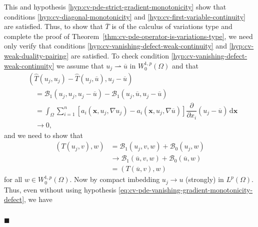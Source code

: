 \begingroup
\renewcommand{\endProof}{\par\nobreak\hfill$\blacksquare$\par\vspace{0.1cm}}
\begingroup
\renewenvironment{Proof}{\par}{\par\nobreak\hfill$\blacksquare$\par\vspace{0.1cm}}
\begin{Proof}
This and hypothesis \ref{hyp:cv-pde-strict-gradient-monotonicity} show that conditions \ref{hyp:cv-diagonal-monotonicity} and \ref{hyp:cv-first-variable-continuity} are satisfied. Thus, to show that $\overline T$ is of the calculus of variations type and complete the proof of Theorem~\ref{thm:cv-pde-operator-is-variations-type}, we need only verify that conditions \ref{hyp:cv-vanishing-defect-weak-continuity} and \ref{hyp:cv-weak-duality-pairing} are satisfied. To check condition \ref{hyp:cv-vanishing-defect-weak-continuity} we assume that $u_j\rightharpoonup\overline u$ in $W_0^{1,p}(\Omega)$ and that
\begin{equation}\label{eq:cv-pde-vanishing-gradient-monotonicity-defect}
\begin{aligned}
&(\widehat T(u_j,u_j)-\widehat T(u_j,\overline u),u_j-\overline u)\\
&\quad=\mathcal{B}_1(u_j,u_j,u_j-\overline u)-\mathcal{B}_1(u_j,\overline u,u_j-\overline u)\\
&\quad=\int_\Omega\sum_{i=1}^n[a_i(\bm{x},u_j,\nabla u_j)-a_i(\bm{x},u_j,\nabla\overline u)]\dfrac{\partial}{\partial x_i}(u_j-\overline u)\,\mathrm{d}\bm{x}\\
&\quad\to0,
\end{aligned}
\end{equation}
and we need to show that
\begin{equation}\label{eq:cv-pde-source-unhatted-test-operator-limit}
\begin{aligned}(T(u_j,v),w)&=\mathcal{B}_1(u_j,v,w)+\mathcal{B}_0(u_j,w)\\&\to\mathcal{B}_1(\overline u,v,w)+\mathcal{B}_0(\overline u,w)\\&=(T(\overline u,v),w)\end{aligned}
\end{equation}
for all $w\in W_0^{1,p}(\Omega)$. Now by compact imbedding $u_j\to u$ (strongly) in $L^p(\Omega)$. Thus, even without using hypothesis \eqref{eq:cv-pde-vanishing-gradient-monotonicity-defect}, we have\[\begin{aligned}

\end{aligned}\]
\end{Proof}
